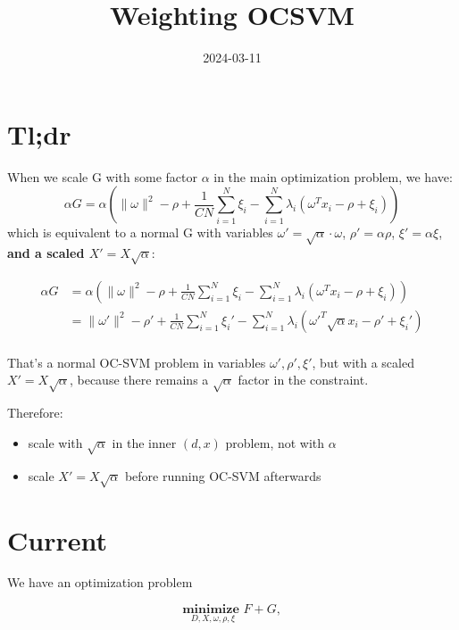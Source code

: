\documentclass[
  letterpaper,
  DIV=11,
  numbers=noendperiod]{scrartcl}
\title{Weighting OCSVM}
\author{}
\date{2024-03-11}
\providecommand{\tightlist}{%
  \setlength{\itemsep}{0pt}\setlength{\parskip}{0pt}}\usepackage{longtable,booktabs,array}
\renewcommand*\contentsname{Table of contents}
\newcommand\contentsname{Table of contents}
\begin{document}
\maketitle

\renewcommand*\contentsname{Table of contents}
{
\hypersetup{linkcolor=}
\setcounter{tocdepth}{3}
\tableofcontents
}
\section{Tl;dr}\label{tldr}

When we scale G with some factor \(\alpha\) in the main optimization
problem, we have: \[
\alpha G = \alpha \left( \|\omega\|^2 - \rho + \frac{1}{CN} \sum_{i=1}^{N} \xi_i
- \sum_{i=1}^{N} \lambda_i (\omega^T x_i - \rho + \xi_i) \right)
\] which is equivalent to a normal G with variables
\(\omega' = \sqrt{\alpha} \cdot \omega\), \(\rho' = \alpha \rho\),
\(\xi' = \alpha \xi\), \textbf{and a scaled \(X' = X \sqrt{\alpha}\)}:

\[
\begin{align}
\alpha G &= \alpha \left( \|\omega\|^2 - \rho + \frac{1}{CN} \sum_{i=1}^{N} \xi_i
- \sum_{i=1}^{N} \lambda_i (\omega^T x_i - \rho + \xi_i) \right) \\
&= \|\omega'\|^2 - \rho' + \frac{1}{CN} \sum_{i=1}^{N} \xi_i' - \sum_{i=1}^{N} \lambda_i (\omega'^T \sqrt{\alpha} x_i - \rho' + \xi_i') \\
\end{align}
\]

That's a normal OC-SVM problem in variables \(\omega', \rho', \xi'\),
but with a scaled \(X' = X \sqrt{\alpha}\), because there remains a
\(\sqrt{\alpha}\) factor in the constraint.

Therefore:

\begin{itemize}
\tightlist
\item
  scale with \(\sqrt{\alpha}\) in the inner \((d,x)\) problem, not with
  \(\alpha\)
\item
  scale \(X' = X \sqrt{\alpha}\) before running OC-SVM afterwards
\end{itemize}

\section{Current}\label{current}

We have an optimization problem

\[\underset{D, X, \omega, \rho, \xi}{\textbf{minimize  }} F + G,\]
\end{document}
